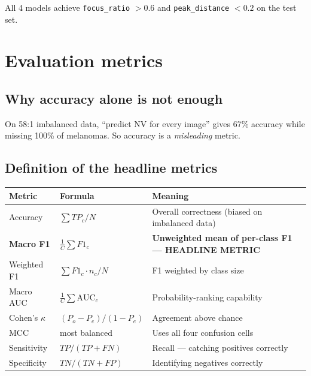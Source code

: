 \documentclass[11pt,a4paper]{article}
\begin{document}
All 4 models achieve \texttt{focus\_ratio} $> 0.6$ and \texttt{peak\_distance} $< 0.2$ on the test set.

\section{Evaluation metrics}

\subsection{Why accuracy alone is not enough}

\begin{simple}
On 58:1 imbalanced data, ``predict NV for every image'' gives 67\% accuracy while missing 100\% of melanomas. So accuracy is a \textit{misleading} metric.
\end{simple}

\subsection{Definition of the headline metrics}

\begin{table}[h]
\centering\small
\begin{tabular}{lll}
\toprule
\textbf{Metric} & \textbf{Formula} & \textbf{Meaning} \\
\midrule
Accuracy        & $\sum TP_c / N$            & Overall correctness (biased on imbalanced data) \\
\textbf{Macro F1} & $\frac{1}{C}\sum F1_c$  & \textbf{Unweighted mean of per-class F1 --- HEADLINE METRIC} \\
Weighted F1     & $\sum F1_c \cdot n_c / N$  & F1 weighted by class size \\
Macro AUC       & $\frac{1}{C}\sum \mathrm{AUC}_c$ & Probability-ranking capability \\
Cohen's $\kappa$ & $(P_o - P_e)/(1 - P_e)$  & Agreement above chance \\
MCC             & most balanced              & Uses all four confusion cells \\
Sensitivity     & $TP/(TP+FN)$              & Recall --- catching positives correctly \\
Specificity     & $TN/(TN+FP)$              & Identifying negatives correctly \\
\bottomrule
\end{tabular}
\end{table}
\end{document}
